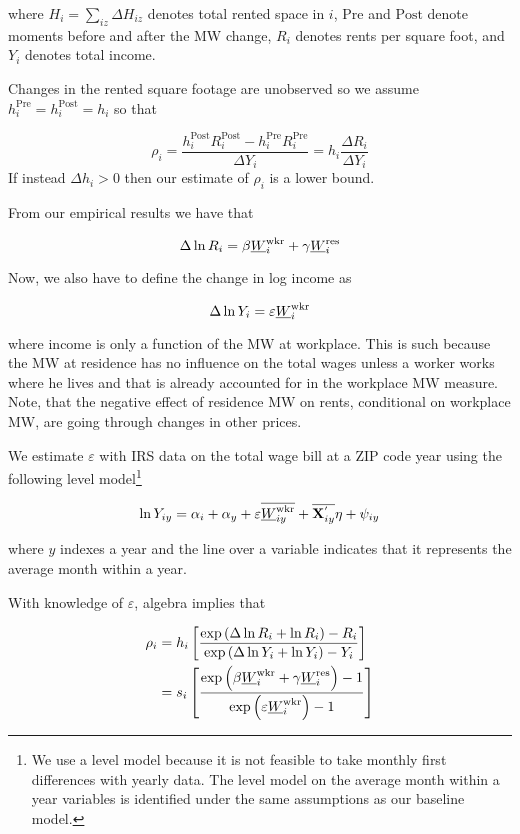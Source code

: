 where $H_i = \sum_{iz}\Delta H_{iz}$ denotes total rented space in $i$, 
$\text{Pre}$ and $\text{Post}$ denote moments before and after the MW change,
$R_i$ denotes rents per square foot, and 
$Y_i$ denotes total income.

Changes in the rented square footage are unobserved so we assume 
$h^{\text{Pre}}_i = h^{\text{Post}}_i = h_i$ so that

\begin{equation*}
	\rho_i = \frac{h^{\text{Post}}_i R^{\text{Post}}_i - h^{\text{Pre}}_i R^{\text{Pre}}_i}{\Delta Y_i} = 
	         h_i \frac{\Delta R_i}{\Delta Y_i}
\end{equation*}
If instead $\Delta h_i > 0$ then our estimate of $\rho_i$ is a lower bound.

From our empirical results we have that

\[
    \Delta \ln R_i = \beta \underline{W}_i^{\text{wkr}} + \gamma \underline{W}_i^{\text{res}}
\]

Now, we also have to define the change in log income as

\[
    \Delta \ln Y_i = \varepsilon \underline{W}_i^{\text{wkr}}
\]

where income is only a function of the MW at workplace. This is such because
the MW at residence has no influence on the total wages unless a worker works 
where he lives and that is already accounted for in the workplace MW measure. Note,
that the negative effect of residence MW on rents, conditional on workplace MW, are
going through changes in other prices. 

We estimate $\varepsilon$ with IRS data on the total wage bill at a ZIP code year using
the following level model\footnote{We use a level model because it is not feasible to 
take monthly first differences with yearly data. The level model on the average month 
within a year variables is identified under the same assumptions as our baseline model.} 

\begin{equation}\label{eq:wage_level_model}
    \ln Y_{iy} = \alpha_i + \alpha_y + \varepsilon \overline{\underline{W}_{iy}^{\text{wkr}}} + 
                 \overline{\mathbf{X}^{'}_{iy}}\eta + \psi_{iy}
\end{equation}

where $y$ indexes a year and the line over a variable indicates that it represents 
the average month within a year.

With knowledge of $\varepsilon$, algebra implies that

\begin{equation}
	\begin{split}
		\rho_i & = h_i \left[ 
		\frac{\exp \left(\Delta \ln R_i + \ln R_i \right) - R_i }{\exp \left( \Delta \ln Y_i + \ln Y_i \right) - Y_i }
		\right] \\
		& = s_i \left[
		\frac{\exp \left( \beta \underline{W}_i^{\text{wkr}} + \gamma \underline{W}_i^{\text{res}} \right) - 1 }{\exp \left( \varepsilon \underline{W}_i^{\text{wkr}} \right) - 1 }
		\right]
	\end{split}
\end{equation}

